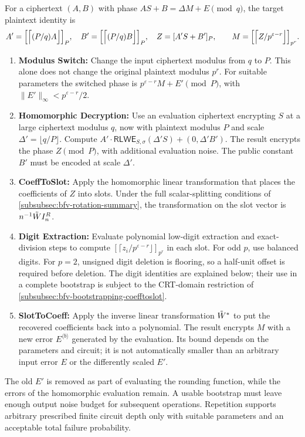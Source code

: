 For a ciphertext $(A,B)$ with phase $AS+B=\Delta M+E\pmod q$, the target plaintext identity is
\[
A'=\Bigl[\Bigl\lceil(P/q)A\Bigr\rfloor\Bigr]_P,\quad
B'=\Bigl[\Bigl\lceil(P/q)B\Bigr\rfloor\Bigr]_P,\quad
Z=[A'S+B']_P,
\qquad M=\Bigl[\Bigl\lceil Z/p^{\varepsilon-r}\Bigr\rfloor\Bigr]_{p^r}.
\]
\begin{enumerate}
\item \textbf{Modulus Switch:} Change the input ciphertext modulus from $q$ to $P$. This alone does not change the original plaintext modulus $p^r$. For suitable parameters the switched phase is $p^{\varepsilon-r}M+E'\pmod P$, with $\|E'\|_\infty<p^{\varepsilon-r}/2$.
\item \textbf{Homomorphic Decryption:} Use an evaluation ciphertext encrypting $S$ at a large ciphertext modulus $q$, now with plaintext modulus $P$ and scale $\Delta'=\lfloor q/P\rfloor$. Compute $A'\cdot\textsf{RLWE}_{S,\sigma}(\Delta'S)+(0,\Delta'B')$. The result encrypts the phase $Z\pmod P$, with additional evaluation noise. The public constant $B'$ must be encoded at scale $\Delta'$.
\item \textbf{\textsf{CoeffToSlot}:} Apply the homomorphic linear transformation that places the coefficients of $Z$ into slots. Under the full scalar-splitting conditions of \autoref{subsubsec:bfv-rotation-summary}, the transformation on the slot vector is $n^{-1}\tilde W I_n^R$.
\item \textbf{Digit Extraction:} Evaluate polynomial low-digit extraction and exact-division steps to compute $[\lceil z_i/p^{\varepsilon-r}\rfloor]_{p^r}$ in each slot. For odd $p$, use balanced digits. For $p=2$, unsigned digit deletion is flooring, so a half-unit offset is required before deletion. The digit identities are explained below; their use in a complete bootstrap is subject to the CRT-domain restriction of \autoref{subsubsec:bfv-bootstrapping-coefftoslot}.
\item \textbf{\textsf{SlotToCoeff}:} Apply the inverse linear transformation $\tilde W^*$ to put the recovered coefficients back into a polynomial. The result encrypts $M$ with a new error $E^{\langle b\rangle}$ generated by the evaluation. Its bound depends on the parameters and circuit; it is not automatically smaller than an arbitrary input error $E$ or the differently scaled $E'$.
\end{enumerate}

The old $E'$ is removed as part of evaluating the rounding function, while the errors of the homomorphic evaluation remain. A usable bootstrap must leave enough output noise budget for subsequent operations. Repetition supports arbitrary prescribed finite circuit depth only with suitable parameters and an acceptable total failure probability.

